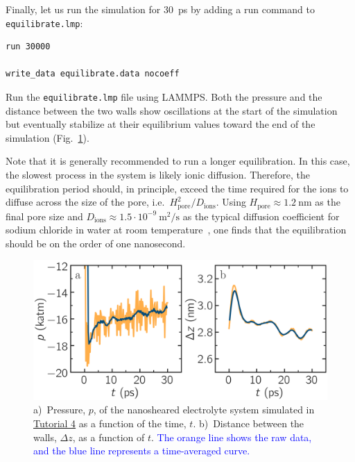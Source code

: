 \documentclass[9pt,tutorial]{livecoms}
\newcommand{\lmpcmd}[1]{\hspace{0pt}\colorbox{listing}{\textcolor{command}{\small{#1}}}\hspace{0pt}} %
\newcommand{\flecmd}[1]{\textcolor{command}{\texttt{#1}}} %
\begin{document}
Finally, let us run the simulation for 30~ps by adding a \lmpcmd{run} command
to \flecmd{equilibrate.lmp}:
\begin{lstlisting}
run 30000

write_data equilibrate.data nocoeff
\end{lstlisting}
Run the \flecmd{equilibrate.lmp} file using LAMMPS.  Both the pressure and the distance
between the two walls show oscillations at the start of the simulation
but eventually stabilize at their equilibrium values toward
the end of the simulation (Fig.~\ref{fig:NANOSHEAR-equilibration}).

\begin{note}
Note that it is generally recommended to run a longer equilibration.  In this case,
the slowest process in the system is likely ionic diffusion.
Therefore, the equilibration period should, in principle, exceed the time required
for the ions to diffuse across the size of the pore, i.e.~$H_\text{pore}^2/D_\text{ions}$.
Using $H_\text{pore} \approx 1.2~\text{nm}$ as the final pore size
and $D_\text{ions} \approx 1.5 \cdot 10^{-9}~\text{m}^2/\text{s}$
as the typical diffusion coefficient for sodium chloride in water at room
temperature~\cite{mills1955remeasurement}, one finds that the equilibration
should be on the order of one nanosecond.
\end{note}

\begin{figure}
\centering
\includegraphics[width=\linewidth]{NANOSHEAR-equilibration}
\caption{a)~Pressure, $p$, of the nanosheared electrolyte system
simulated in \hyperref[sheared-confined-label]{Tutorial 4} as a function of the
time, $t$.  b)~Distance between the walls, $\Delta z$, as a function of $t$.
\textcolor{blue}{The orange line
shows the raw data, and the blue line represents a time-averaged curve.}}
\label{fig:NANOSHEAR-equilibration}
\end{figure}
\end{document}
